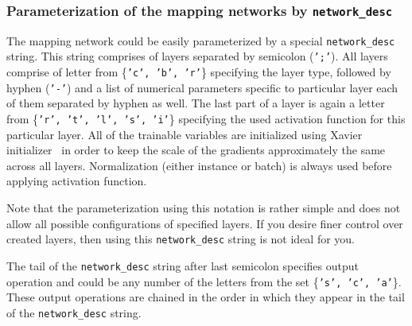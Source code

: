 \subsubsection{Parameterization of the mapping networks by \texttt{network\_desc}} \label{networkdesc}
The mapping network could be easily parameterized by a special \texttt{network\_desc} string. This string comprises of layers separated by semicolon (\texttt{';'}). All layers comprise of letter from \{\texttt{'c', 'b', 'r'}\} specifying the layer type, followed by hyphen (\texttt{'-'}) and a list of numerical parameters specific to particular layer each of them separated by hyphen as well. The last part of a layer is again a letter from \{\texttt{'r', 't', 'l', 's', 'i'}\} specifying the used activation function for this particular layer. All of the trainable variables are initialized using Xavier initializer~\cite{xavier} in order to keep the scale of the gradients approximately the same across all layers. Normalization (either instance or batch) is always used before applying activation function.

Note that the parameterization using this notation is rather simple and does not allow all possible configurations of specified layers. If you desire finer control over created layers, then using this \texttt{network\_desc} string is not ideal for you.

The tail of the \texttt{network\_desc} string after last semicolon specifies output operation and could be any number of the letters from the set \{\texttt{'s', 'c', 'a'}\}. These output operations are chained in the order in which they appear in the tail of the \texttt{network\_desc} string.

